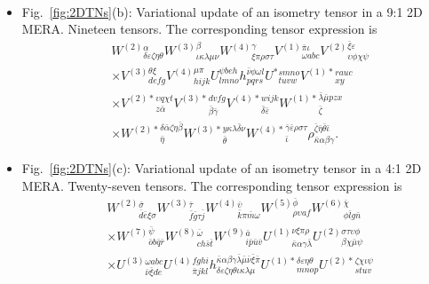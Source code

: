 \documentclass[aps,pre,reprint,superscriptaddress,amsfonts,amsmath,showpacs,nofootinbib,floatfix]{revtex4-1}
\newcommand{\fref}[1]{Fig.~\ref{#1}}
\begin{document}
\begin{itemize}
\begin{equation}
\begin{split}
\end{split}\label{eq:21MERA}
\end{equation}
\item \fref{fig:2DTNs}(b): Variational update of an isometry tensor in a 9:1 2D MERA. Nineteen tensors. The corresponding tensor expression is
\begin{equation}
\begin{split}
&W^{(2)}{}^\alpha_{\delta\varepsilon\zeta\eta\theta}W^{(3)}{}^\beta_{\iota\kappa\lambda\mu\nu}W^{(4)}{}^\gamma_{\xi\pi\rho\sigma\tau}V^{(1)}{}^{\bar\pi\iota}_{\omega a b c}V^{(2)}{}^{\bar\xi\varepsilon}_{\upsilon\phi\chi\psi}\\
&\times V^{(3)}{}^{\theta\xi}_{d e f g}V^{(4)}{}^{\mu\pi}_{h i j k}U^{\psi b e h}_{l m n o}h^{\bar\nu\phi\omega l}_{p q r s} U^*{}^{s m n o}_{t u v w} V^{(1)*}{}^{r a u c}_{x y}   \\
&\times V^{(2)*}{}^{\upsilon q \chi t}_{z\bar\alpha} V^{(3)*}{}^{d v f g}_{\bar\beta\bar\gamma}V^{(4)*}{}^{w i j k}_{\bar\delta\bar\varepsilon}W^{(1)*}{}^{\bar\lambda\bar\mu p z x}_{\bar\zeta} \\
&\times W^{(2)*}{}^{\delta \bar\alpha \zeta\eta \bar\beta}_{\bar\eta} W^{(3)*}{}^{y \kappa\lambda\bar\delta\nu}_{\bar\theta} W^{(4)*}{}^{\bar\gamma\bar\varepsilon\rho\sigma\tau}_{\bar\iota} \rho^{\bar\zeta\bar\eta\bar\theta\bar\iota}_{\bar\kappa\alpha\beta\gamma}\label{eq:2DTN1}.
\end{split}
\end{equation}
\item \fref{fig:2DTNs}(c): Variational update of an isometry tensor in a 4:1 2D MERA. Twenty-seven tensors. The corresponding tensor expression is
\begin{equation}
\begin{split}
&W^{(2)}{}^{\bar\sigma}_{\bar{d}\bar{e}\xi\sigma}W^{(3)}{}^{\bar\tau}_{\bar f\bar g\tau\bar j}W^{(4)}{}^{\bar\upsilon}_{\bar k\pi\bar m\omega}W^{(5)}{}^{\bar\phi}_{\rho\upsilon a f}W^{(6)}{}^{\bar\chi}_{\phi\bar l g \bar n}\\
&\times W^{(7)}{}^{\bar\psi}_{\bar o b \bar q \bar r}W^{(8)}{}^{\bar\omega}_{c h \bar s\bar t}W^{(9)}{}^{\bar a}_{i \bar p\bar u\bar v} U^{(1)}{}^{\nu\xi\pi\rho}_{\bar\kappa\alpha\gamma\bar\lambda}U^{(2)}{}^{\sigma\tau\upsilon\phi}_{\beta\chi\bar\mu\psi}
\\
&\times U^{(3)}{}^{\omega abc}_{\bar\nu\bar\xi d e}U^{(4)}{}^{f g h i}_{\bar\pi j k l}h^{\bar\kappa\alpha\beta\gamma\bar\lambda\bar\mu\bar\nu\bar\xi\bar\pi}_{\delta\varepsilon\zeta\eta\theta\iota\kappa\lambda\mu}U^{(1)*}{}^{\delta\varepsilon\eta\theta}_{m n o p} U^{(2)*}{}^{\zeta\chi\iota\psi}_{s t u v}

\end{split}
\end{equation}
\end{itemize}
\end{document}
